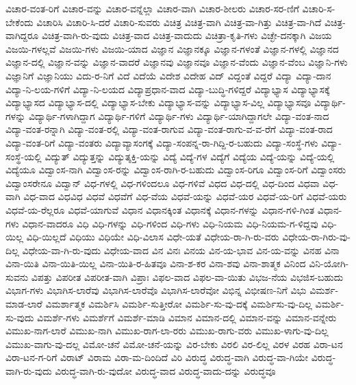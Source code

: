 {ವಿಚಾರ-ವಂತ-ರಿಗೆ
ವಿಚಾರ-ವನ್ನು
ವಿಚಾರ-ವನ್ನೆಲ್ಲಾ
ವಿಚಾರ-ವಾಗಿ
ವಿಚಾರ-ಶೀಲರು
ವಿಚಾರ-ಸರ-ಣಿಗೆ
ವಿಚಾರಿ-ಸ-ಬೇಕೆಂದು
ವಿಚಾರಿಸಿ
ವಿಚಾರಿ-ಸಿ-ದರೆ
ವಿಚಾರಿ-ಸುವರು
ವಿಚಿತ್ರ
ವಿಚಿತ್ರ-ವಾಗಿ
ವಿಚಿತ್ರ-ವಾ-ಗಿತ್ತು
ವಿಚಿತ್ರ-ವಾ-ಗಿದೆ
ವಿಚಿತ್ರ-ವಾಗಿದ್ದರೂ
ವಿಚಿತ್ರ-ವಾಗಿ-ರು-ವುದು
ವಿಚಿತ್ರ-ವಾದ
ವಿಚಿತ್ರ-ವಾದುದು
ವಿಚಿತ್ರಾ-ಕೃತಿ-ಗಳು
ವಿಚ್ಛೇ-ದನಕ್ಕಾಗಿ
ವಿಜಯ
ವಿಜಯಿ-ಗಳಲ್ಲವೆ
ವಿಜಯಿ-ಗಳು
ವಿಜಯಿ-ಯಾದ
ವಿಜ್ಞಾನ
ವಿಜ್ಞಾನಕ್ಕೂ
ವಿಜ್ಞಾನ-ಗಳಂತೆ
ವಿಜ್ಞಾನ-ಗಳಲ್ಲಿ
ವಿಜ್ಞಾನದ
ವಿಜ್ಞಾನ-ದಲ್ಲಿ
ವಿಜ್ಞಾನ-ವನ್ನು
ವಿಜ್ಞಾನ-ವಾದರೆ
ವಿಜ್ಞಾನವು
ವಿಜ್ಞಾನವೂ
ವಿಜ್ಞಾನ-ವೆಂದು
ವಿಜ್ಞಾನ-ವೆಂಬ
ವಿಜ್ಞಾನಿ-ಗಳು
ವಿಜ್ಞಾನಿಗೆ
ವಿಜ್ಞಾನಿಯು
ವಿದು-ರ-ನಿಗೆ
ವಿದೆ
ವಿದೆಯೆ
ವಿದೇಶ
ವಿದೇಹ
ವಿದ್
ವಿದ್ದಂತೆ
ವಿದ್ದರೆ
ವಿದ್ಯಾ
ವಿದ್ಯಾ-ದಾನ
ವಿದ್ಯಾ-ನಿ-ಲಯ-ಗಳಿಗೆ
ವಿದ್ಯಾ-ನಿ-ಲಯದ
ವಿದ್ಯಾಪ್ರಧಾನ-ವಾದ
ವಿದ್ಯಾ-ಬುದ್ಧಿ-ಗಳಿದ್ದರೆ
ವಿದ್ಯಾಭ್ಯಾಸ
ವಿದ್ಯಾಭ್ಯಾಸಕ್ಕೆ
ವಿದ್ಯಾಭ್ಯಾಸದ
ವಿದ್ಯಾಭ್ಯಾಸ-ದಲ್ಲಿ
ವಿದ್ಯಾಭ್ಯಾಸ-ಬೇಕು
ವಿದ್ಯಾಭ್ಯಾಸ-ವನ್ನು
ವಿದ್ಯಾಭ್ಯಾಸ-ವಿಲ್ಲ
ವಿದ್ಯಾಭ್ಯಾಸವೂ
ವಿದ್ಯಾರ್ಥಿ-ಗಳನ್ನು
ವಿದ್ಯಾರ್ಥಿ-ಗಳಾಗಿದ್ದಾಗ
ವಿದ್ಯಾರ್ಥಿ-ಗಳಿಗೆ
ವಿದ್ಯಾರ್ಥಿ-ಗಳು
ವಿದ್ಯಾರ್ಥಿ-ಯಾಗಿದ್ದಾಗಲೇ
ವಿದ್ಯಾ-ವಂತ-ನಾದ
ವಿದ್ಯಾ-ವಂತ-ರನ್ನಾಗಿ
ವಿದ್ಯಾ-ವಂತ-ರಲ್ಲಿ
ವಿದ್ಯಾ-ವಂತ-ರಾಗುವ
ವಿದ್ಯಾ-ವಂತ-ರಾಗು-ವ-ವ-ರೆಗೆ
ವಿದ್ಯಾ-ವಂತ-ರಾದ
ವಿದ್ಯಾ-ವಂತ-ರಿಗೆ
ವಿದ್ಯಾ-ವಂತರು
ವಿದ್ಯಾವ್ಯಾಸಂಗಕ್ಕೆ
ವಿದ್ಯಾ-ಸಂಪನ್ನ-ರಾ-ಗಿದ್ದಿ-ರ-ಬಹುದು
ವಿದ್ಯಾ-ಸಂಸ್ಥೆ-ಗಳು
ವಿದ್ಯಾ-ಸಂಸ್ಥೆ-ಯಲ್ಲಿ
ವಿದ್ಯುತ್
ವಿದ್ಯುತ್ತನ್ನು
ವಿದ್ಯುತ್ಶಕ್ತಿ-ಯನ್ನು
ವಿದ್ಯೆ
ವಿದ್ಯೆ-ಗಳ
ವಿದ್ಯೆಗೆ
ವಿದ್ಯೆಯ
ವಿದ್ಯೆ-ಯನ್ನು
ವಿದ್ಯೆ-ಯಲ್ಲಿ
ವಿದ್ಯೆಯೂ
ವಿದ್ವಾಂಸ-ನಾಗಿ
ವಿದ್ವಾಂಸ-ರನ್ನು
ವಿದ್ವಾಂಸ-ರಾಗಿ-ರ-ಬಹುದು
ವಿದ್ವಾಂಸ-ರಿಗೂ
ವಿದ್ವಾಂಸ-ರಿಗೆ
ವಿದ್ವಾಂಸರು
ವಿದ್ವಾಂಸರೇನೂ
ವಿದ್ವಾನ್
ವಿಧ-ಗಳಲ್ಲಿ
ವಿಧ-ಗಳಿಂದಲೂ
ವಿಧ-ಗಳಿವೆ
ವಿಧದ
ವಿಧ-ದಲ್ಲಿ
ವಿಧ-ದಿಂದ
ವಿಧವಾ
ವಿಧ-ವಾಗಿ
ವಿಧ-ವಾದ
ವಿಧವಿಧ
ವಿಧವೆ
ವಿಧವೆಗೆ
ವಿಧ-ವೆಯ
ವಿಧವೆ-ಯನ್ನು
ವಿಧವೆ-ಯರ
ವಿಧವೆ-ಯ-ರಿಗೆ
ವಿಧವೆ-ಯರು
ವಿಧವೆ-ಯ-ರೆಲ್ಲರೂ
ವಿಧವೆ-ಯಾಗುವೆ
ವಿಧಾನ
ವಿಧಾನಕ್ಕಿಂತ
ವಿಧಾನಕ್ಕೆ
ವಿಧಾನ-ಗಳನ್ನು
ವಿಧಾನ-ಗಳಿ-ಗಿಂತ
ವಿಧಾನ-ಗಳು
ವಿಧಾನ-ವಾದರೂ
ವಿಧಿ
ವಿಧಿ-ಗಳನ್ನು
ವಿಧಿ-ಗಳಿಂದ
ವಿಧಿ-ಗಳು
ವಿಧಿ-ನಿಯಮ
ವಿಧಿ-ನಿಯಮ-ಗ-ಳಿದ್ದವು
ವಿಧಿ-ಯಿಲ್ಲ
ವಿಧಿ-ಯಿಲ್ಲದೆ
ವಿಧಿಯು
ವಿಧಿಯೇ
ವಿಧಿ-ವಿಲಾಸ
ವಿಧೇ-ಯತೆ
ವಿಧೇಯ-ರಾ-ಗಿ-ರು-ವರು
ವಿಧೇಯ-ರಾ-ಗಿರು-ವು-ದಿಲ್ಲ
ವಿಧೇಯ-ವಾ-ಗಿ-ರು-ವುದು
ವಿಧೇಯ-ವಾದ
ವಿನ
ವಿನಃ
ವಿನಯ
ವಿನ-ಯ-ಭಾವ
ವಿನ-ಯ-ವನ್ನು
ವಿನಹ
ವಿನಾ
ವಿನಾ-ಯಿತಿ
ವಿನಾ-ಯಿತಿ-ಯಿಲ್ಲ
ವಿನಾ-ಯಿತಿ-ರ-ಹಿತವೂ
ವಿನಾ-ಶ-ಕರ
ವಿನಾ-ಶವು
ವಿನಾ-ಶಾತ್ಮಕ
ವಿನಿಂದ
ವಿನಿ-ಯೋಗಿ-ಸುವನು
ವಿಪತ್ತು
ವಿಪರೀತ
ವಿಪರೀತ-ವಾಗಿ
ವಿಪ್ರಾಃ
ವಿಫಲ-ವಾದ
ವಿಫಲ-ವಾ-ಯಿತು
ವಿಭಜ-ನೆಯ
ವಿಭಜಿಸ-ಬಹುದು
ವಿಭಾಗ-ಗಳು
ವಿಭಾಗಿಸ-ಲಾರೆವು
ವಿಭಾಗಿಸ-ಲಾರೆವೊ
ವಿಭಾಗಿಸ-ಲಾರೆವೋ
ವಿಭಿನ್ನ
ವಿಭೀಷಣ-ನಿಗೆ
ವಿಭು
ವಿಮರ್ಶ-ಮಾಡ-ಲಾರೆ
ವಿಮರ್ಶಾತ್ಮಕ
ವಿಮರ್ಶಿಸಿ
ವಿಮರ್ಶಿ-ಸುತ್ತೀರೋ
ವಿಮರ್ಶಿ-ಸು-ವು-ದಕ್ಕೆ
ವಿಮರ್ಶಿಸು-ವು-ದಿಲ್ಲ
ವಿಮರ್ಶಿ-ಸು-ವುದು
ವಿಮರ್ಶೆ-ಗಳು
ವಿಮರ್ಶೆಗೆ
ವಿಮರ್ಶೆ-ಮಾಡಿ
ವಿಮಾನ
ವಿಮಾನ-ದಲ್ಲಿ
ವಿಮಾನ-ವನ್ನು
ವಿಮಾನ-ವನ್ನೇರು
ವಿಮುಖ-ನಾಗ-ಲಾರೆ
ವಿಮುಖ-ನಾಗಿ
ವಿಮುಖ-ರಾಗ-ಲಾ-ರರು
ವಿಮುಖ-ರಾಗು-ವರು
ವಿಮುಖ-ಳಾಗು-ವು-ದಿಲ್ಲ
ವಿಮುಖ-ವಾಗು-ವು-ದಲ್ಲ
ವಿಮೋ-ಚನೆ
ವಿಮೋ-ಚನೆ-ಯನ್ನು
ವಿರ-ಬೇಕು
ವಿರಲಿ
ವಿರ-ಲಿಲ್ಲ
ವಿರಳ
ವಿರಹ
ವಿರಾ-ಟನ
ವಿರಾ-ಟನ-ಗ-ರಿಗೆ
ವಿರಾಟ್
ವಿರಾಮ
ವಿರಾ-ಮ-ದಿಂದಿದೆ
ವಿರಿ
ವಿರುದ್ಧ
ವಿರುದ್ಧ-ವಾಗಿ
ವಿರುದ್ಧ-ವಾ-ಗಿಯೇ
ವಿರುದ್ಧ-ವಾಗಿ-ರು-ವುದು
ವಿರುದ್ಧ-ವಾಗಿ-ರು-ವುದೋ
ವಿರುದ್ಧ-ವಾದ
ವಿರುದ್ಧ-ವಾದು-ದನ್ನು
ವಿರುದ್ಧವೂ
}
